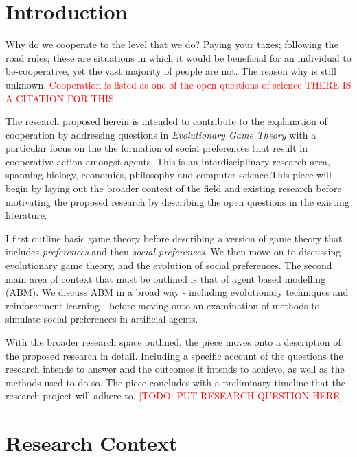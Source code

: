 \documentclass[11pt]{article}
\newcommand{\todo}[1]{\textcolor{red}{[TODO: #1]}\PackageWarning{TODO:}{#1!}}
\newcommand*{\np}{\par\noindent\newline}
\begin{document}
\newpage
\tableofcontents
\newpage
\section{Introduction}
Why do we cooperate to the level that we do? Paying your taxes; following the
road rules; these are situations in which it would be beneficial for an
individual to be-cooperative, yet the vast majority of people are not. The
reason why is still unknown. \textcolor{red}{Cooperation is listed as one of
the open questions of science THERE IS A CITATION FOR THIS}
\np The research proposed herein is intended to contribute to the explanation
of cooperation by addressing questions in \textit{Evolutionary Game Theory}
with a particular focus on the the formation of social preferences that result
in cooperative action amongst agents. This is an interdisciplinary research
area, spanning biology, economics, philosophy and computer science.This piece
will begin by laying out the broader context of the field and existing research
before motivating the proposed research by describing the open questions in the
existing literature.
\np I first outline basic game theory before describing a version of
game theory that includes \textit{preferences} and then \textit{social
preferences}. We then move on to discussing evolutionary game theory, and the
evolution of social preferences. The second main area of context that must be
outlined is that of agent based modelling (ABM). We discuss ABM in a broad way
- including evolutionary techniques and reinforcement learning - before moving
onto an examination of methods to simulate social preferences in artificial
agents.
\np With the broader research space outlined, the piece moves onto a
description of the proposed research in detail. Including a specific account of
the questions the research intends to answer and the outcomes it intends to
achieve, as well as the methods used to do so. The piece concludes with a
preliminary timeline that the research project will adhere to. 
\todo{PUT RESEARCH QUESTION HERE}
\section{Research Context}
\end{document}
